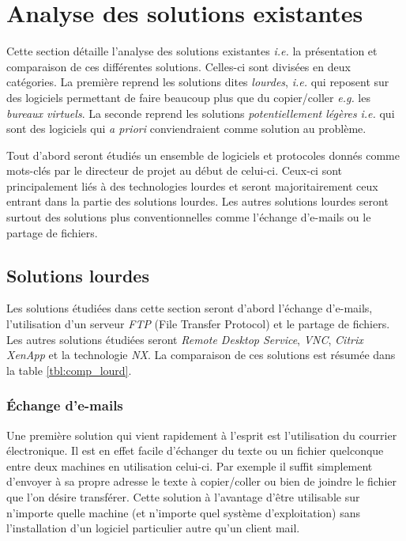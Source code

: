 \chapter{Analyse des solutions existantes}
\renewcommand{\leftmark}{\thechapter.~~Analyse des solutions existantes}
Cette section détaille l'analyse des solutions existantes
\emph{i.e.} la présentation
et comparaison de ces différentes solutions. Celles-ci sont divisées en
deux catégories. La première reprend les solutions dites \emph{lourdes},
\emph{i.e.} qui reposent sur des logiciels permettant de faire
beaucoup plus que du copier/coller \emph{e.g.} les \emph{bureaux virtuels}.
La seconde reprend les solutions \emph{potentiellement légères} \emph{i.e.}
qui sont des logiciels qui \emph{a priori} conviendraient comme solution
au problème.

Tout d'abord seront étudiés un ensemble de logiciels et protocoles
donnés comme mots-clés par le directeur de projet au début de celui-ci.
Ceux-ci sont principalement liés à des technologies lourdes et seront
majoritairement ceux entrant dans la partie des solutions lourdes. Les
autres solutions lourdes seront surtout des solutions plus conventionnelles
comme l'échange d'e-mails ou le partage de fichiers.

\section{Solutions lourdes}
Les solutions étudiées dans cette section seront d'abord l'échange
d'e-mails, l'utilisation d'un serveur \emph{FTP} (File Transfer Protocol)
et le partage de fichiers.
Les autres solutions étudiées seront \emph{Remote Desktop Service},
\emph{VNC}, \emph{Citrix XenApp} et
la technologie \emph{NX}. La comparaison de ces solutions est résumée
dans la table \ref{tbl:comp_lourd}.

\subsection{Échange d'e-mails}
Une première solution qui vient rapidement à l'esprit est l'utilisation
du courrier électronique. Il est en effet facile d'échanger du texte ou
un fichier quelconque entre deux machines en utilisation celui-ci.
Par exemple il suffit simplement d'envoyer à sa propre adresse
le texte à copier/coller ou bien de joindre le fichier que l'on désire
transférer. Cette solution à l'avantage d'être utilisable sur n'importe
quelle machine (et n'importe quel système d'exploitation) sans l'installation
d'un logiciel particulier autre qu'un client mail.

